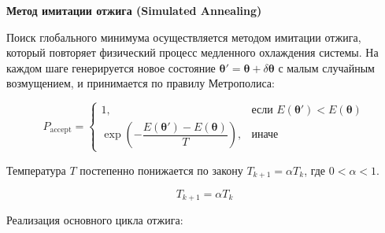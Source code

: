 \documentclass[a4paper]{report}
\begin{document}
\noindent
\textbf{Метод имитации отжига (Simulated Annealing)}

Поиск глобального минимума осуществляется методом имитации отжига, который повторяет физический процесс медленного охлаждения системы. На каждом шаге генерируется новое состояние $\bm\theta' = \bm\theta + \delta\bm\theta$ с малым случайным возмущением, и принимается по правилу Метрополиса:

\begin{equation}
    P_{\text{accept}} =
    \begin{cases}
        1, & \text{если } E(\bm\theta') < E(\bm\theta) \\
        \exp\left(-\dfrac{E(\bm\theta')-E(\bm\theta)}{T}\right), & \text{иначе}
    \end{cases}
\end{equation}

Температура $T$ постепенно понижается по закону $T_{k+1} = \alpha T_k$, где $0 < \alpha < 1$.

\begin{equation}
    T_{k+1} = \alpha T_k
\end{equation}

Реализация основного цикла отжига:
\end{document}
